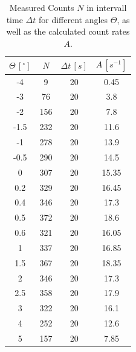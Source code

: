\begin{table}[H]
	\centering
	\caption{Measured Counts $N$ in intervall time $\Delta t$ for different angles $\Theta$, as well as the calculated count rates $A$.}
	\label{tab:small_angles}
	\begin{tabular}{c | c | c | c}
		\toprule
		$\Theta \, [^{\circ}]$ & $N$ & $\Delta t \, [s] $ & $A \, [s^{-1}]$\\
		\midrule
		-4 & 9 & 20 & 0.45 \\
		 -3 & 76 & 20 & 3.8 \\
		 -2 & 156 & 20 & 7.8 \\
		 -1.5 & 232 & 20 & 11.6 \\
		 -1 & 278 & 20 & 13.9 \\
		 -0.5 & 290 & 20 & 14.5 \\
		 0 & 307 & 20 & 15.35 \\
		 0.2 & 329 & 20 & 16.45 \\
		 0.4 & 346 & 20 & 17.3 \\
		 0.5 & 372 & 20 & 18.6 \\
		 0.6 & 321 & 20 & 16.05 \\
		 1 & 337 & 20 & 16.85 \\
		 1.5 & 367 & 20 & 18.35 \\
		 2 & 346 & 20 & 17.3 \\
		 2.5 & 358 & 20 & 17.9 \\
		 3 & 322 & 20 & 16.1 \\
		 4 & 252 & 20 & 12.6 \\
		 5 & 157 & 20 & 7.85 \\
		 \bottomrule
	\end{tabular}
\end{table}

